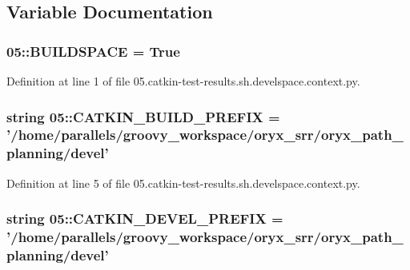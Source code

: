 \subsection{\-Variable \-Documentation}
\subsubsection[{\-B\-U\-I\-L\-D\-S\-P\-A\-C\-E}]{\setlength{\rightskip}{0pt plus 5cm}05\-::{\bf \-B\-U\-I\-L\-D\-S\-P\-A\-C\-E} = \-True}\label{namespace05_a6843fe1cdad583aa5b47b9269a3cb1f9}


\-Definition at line 1 of file 05.\-catkin-\/test-\/results.\-sh.\-develspace.\-context.\-py.

\subsubsection[{\-C\-A\-T\-K\-I\-N\-\_\-\-B\-U\-I\-L\-D\-\_\-\-P\-R\-E\-F\-I\-X}]{\setlength{\rightskip}{0pt plus 5cm}string 05\-::{\bf \-C\-A\-T\-K\-I\-N\-\_\-\-B\-U\-I\-L\-D\-\_\-\-P\-R\-E\-F\-I\-X} = '/home/parallels/groovy\-\_\-workspace/oryx\-\_\-srr/oryx\-\_\-path\-\_\-planning/devel'}\label{namespace05_a7c9e5bee0b35d2901854f376fb3bc282}


\-Definition at line 5 of file 05.\-catkin-\/test-\/results.\-sh.\-develspace.\-context.\-py.

\subsubsection[{\-C\-A\-T\-K\-I\-N\-\_\-\-D\-E\-V\-E\-L\-\_\-\-P\-R\-E\-F\-I\-X}]{\setlength{\rightskip}{0pt plus 5cm}string 05\-::{\bf \-C\-A\-T\-K\-I\-N\-\_\-\-D\-E\-V\-E\-L\-\_\-\-P\-R\-E\-F\-I\-X} = '/home/parallels/groovy\-\_\-workspace/oryx\-\_\-srr/oryx\-\_\-path\-\_\-planning/devel'}\label{namespace05_a39137f4dcd97abcca937ef29e60694f5}


